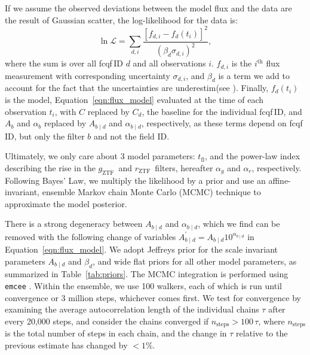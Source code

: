\documentclass[twocolumn]{aastex63}
\newcommand{\rztf}{$r_\mathrm{ZTF}$}
\newcommand{\gztf}{$g_\mathrm{ZTF}$}
\newcommand{\tfl}{$t_\mathrm{fl}$}
\begin{document}
If we assume the observed deviations between the model flux and the data are the result of Gaussian scatter, the log-likelihood for the data is:
%
\begin{equation}
    \ln \mathscr{L} = \sum_{d,i} \frac{[f_{d,i} - f_d(t_i)]^2}{(\beta_d \sigma_{d,i})^2},
\end{equation}
%
where the sum is over all fcqf\,ID $d$ and all observations $i$. $f_{d,i}$ is the $i^\mathrm{th}$ flux measurement with corresponding uncertainty $\sigma_{d,i}$, and $\beta_d$ is a term we add to account for the fact that the uncertainties are underestim\ated (see \citealt{Yao19}). Finally, $f_d(t_i)$ is the model, Equation~\ref{eqn:flux_model} evaluated at the time of each observation $t_i$, with $C$ replaced by $C_d$, the baseline for the individual fcqf\,ID, and $A_b$ and $\alpha_b$ replaced by $A_{b\mid d}$ and $\alpha_{b\mid d}$, respectively, as these terms depend on fcqf\,ID, but only the filter $b$ and not the field ID.

Ultimately, we only care about 3 model parameters: \tfl, and the power-law
index describing the rise in the \gztf\ and \rztf\ filters, hereafter
$\alpha_g$ and $\alpha_r$, respectively. Following Bayes' Law, we multiply
the likelihood by a prior and use an affine-invariant, ensemble Markov chain
Monte Carlo (MCMC) technique \citep{Goodman10} to approximate the model
posterior. 

There is a strong degeneracy between $A_{b\mid d}$ and $\alpha_{b\mid d}$,
which we find can be removed with the following change of variables
$A^\prime_{b\mid d} = A_{b\mid d} 10^{\alpha_{b\mid d}}$ in
Equation~\ref{eqn:flux_model}. We adopt Jeffreys prior \citep{Jeffreys46} for
the scale invariant parameters $A_{b\mid d}$ and $\beta_d$, and wide flat
priors for all other model parameters, as summarized in
Table~\ref{tab:priors}. The MCMC integration is performed using
\texttt{emcee} \citep{Foreman-Mackey13}. Within the ensemble, we use 100
walkers, each of which is run until convergence or 3 million steps, whichever
comes first. We test for convergence by examining the average autocorrelation
length of the individual chains $\tau$ after every 20,000 steps, and consider
the chains converged if $n_\mathrm{steps} > 100 \,\tau$, where
$n_\mathrm{steps}$ is the total number of steps in each chain, and the change
in $\tau$ relative to the previous estimate has changed by $<1\%$.


\end{document}
